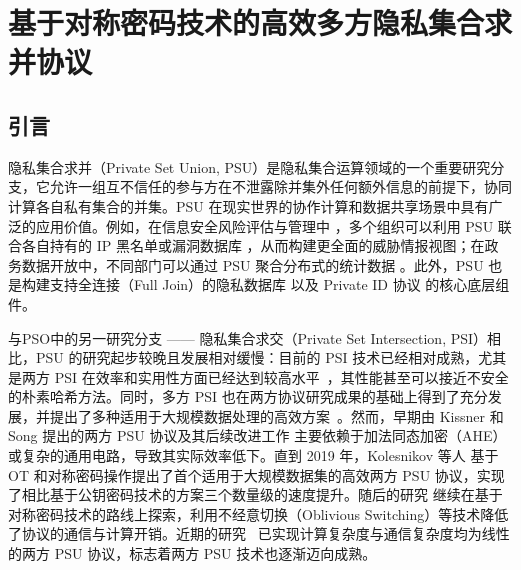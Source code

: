 \chapter{基于对称密码技术的高效多方隐私集合求并协议}

\section{引言}

隐私集合求并（Private Set Union, PSU）是隐私集合运算领域的一个重要研究分支，它允许一组互不信任的参与方在不泄露除并集外任何额外信息的前提下，协同计算各自私有集合的并集。PSU 在现实世界的协作计算和数据共享场景中具有广泛的应用价值。例如，在信息安全风险评估与管理中 \cite{LV04}，多个组织可以利用 PSU 联合各自持有的 IP 黑名单或漏洞数据库 \cite{HLSSSYY16}，从而构建更全面的威胁情报视图；在政务数据开放中，不同部门可以通过 PSU 聚合分布式的统计数据 \cite{KS-CRYPTO-2005}。此外，PSU 也是构建支持全连接（Full Join）的隐私数据库 \cite{KRTW-ASIACRYPT-2019} 以及 Private ID 协议 \cite{GMRSS-PKC-2021} 的核心底层组件。

与PSO中的另一研究分支 —— 隐私集合求交（Private Set Intersection, PSI）相比，PSU 的研究起步较晚且发展相对缓慢：目前的 PSI 技术已经相对成熟，尤其是两方 PSI 在效率和实用性方面已经达到较高水平~\cite{PSZ-USENIX-2014,KKRT-CCS-2016,PRTY-CRYPTO-2019,CM-CRYPTO-2020,PRTY20,RS-EUROCRYPT-2021,RR-CCS-2022}，其性能甚至可以接近不安全的朴素哈希方法。同时，多方 PSI 也在两方协议研究成果的基础上得到了充分发展，并提出了多种适用于大规模数据处理的高效方案~\cite{KMPRT-CCS-2017,NTY-CCS-2021,CDGOSS-CCS-2021,BNOP-AsiaCCS-2022}。然而，早期由 Kissner 和 Song \cite{KS-CRYPTO-2005} 提出的两方 PSU 协议及其后续改进工作 \cite{Frikken-ACNS-2007}主要依赖于加法同态加密（AHE）或复杂的通用电路，导致其实际效率低下。直到 2019 年，Kolesnikov 等人 \cite{KRTW-ASIACRYPT-2019} 基于 OT 和对称密码操作提出了首个适用于大规模数据集的高效两方 PSU 协议，实现了相比基于公钥密码技术的方案三个数量级的速度提升。随后的研究 \cite{GMRSS-PKC-2021, Jia-USENIX-2022} 继续在基于对称密码技术的路线上探索，利用不经意切换（Oblivious Switching）等技术降低了协议的通信与计算开销。近期的研究~\cite{ZCLZL-USENIX-2023,ZCZDL-2024} 已实现计算复杂度与通信复杂度均为线性的两方 PSU 协议，标志着两方 PSU 技术也逐渐迈向成熟。

